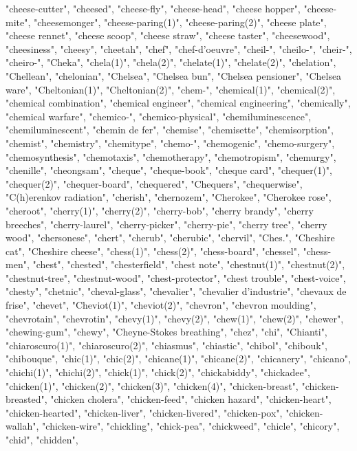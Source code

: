 "cheese-cutter",
"cheesed",
"cheese-fly",
"cheese-head",
"cheese hopper",
"cheese-mite",
"cheesemonger",
"cheese-paring(1)",
"cheese-paring(2)",
"cheese plate",
"cheese rennet",
"cheese scoop",
"cheese straw",
"cheese taster",
"cheesewood",
"cheesiness",
"cheesy",
"cheetah",
"chef",
"chef-d'oeuvre",
"cheil-",
"cheilo-",
"cheir-",
"cheiro-",
"Cheka",
"chela(1)",
"chela(2)",
"chelate(1)",
"chelate(2)",
"chelation",
"Chellean",
"chelonian",
"Chelsea",
"Chelsea bun",
"Chelsea pensioner",
"Chelsea ware",
"Cheltonian(1)",
"Cheltonian(2)",
"chem-",
"chemical(1)",
"chemical(2)",
"chemical combination",
"chemical engineer",
"chemical engineering",
"chemically",
"chemical warfare",
"chemico-",
"chemico-physical",
"chemiluminescence",
"chemiluminescent",
"chemin de fer",
"chemise",
"chemisette",
"chemisorption",
"chemist",
"chemistry",
"chemitype",
"chemo-",
"chemogenic",
"chemo-surgery",
"chemosynthesis",
"chemotaxis",
"chemotherapy",
"chemotropism",
"chemurgy",
"chenille",
"cheongsam",
"cheque",
"cheque-book",
"cheque card",
"chequer(1)",
"chequer(2)",
"chequer-board",
"chequered",
"Chequers",
"chequerwise",
"C(h)erenkov radiation",
"cherish",
"chernozem",
"Cherokee",
"Cherokee rose",
"cheroot",
"cherry(1)",
"cherry(2)",
"cherry-bob",
"cherry brandy",
"cherry breeches",
"cherry-laurel",
"cherry-picker",
"cherry-pie",
"cherry tree",
"cherry wood",
"chersonese",
"chert",
"cherub",
"cherubic",
"chervil",
"Ches.",
"Cheshire cat",
"Cheshire cheese",
"chess(1)",
"chess(2)",
"chess-board",
"chessel",
"chess-men",
"chest",
"chested",
"chesterfield",
"chest note",
"chestnut(1)",
"chestnut(2)",
"chestnut-tree",
"chestnut-wood",
"chest-protector",
"chest trouble",
"chest-voice",
"chesty",
"chetnic",
"cheval-glass",
"chevalier",
"chevalier d'industrie",
"chevaux de frise",
"chevet",
"Cheviot(1)",
"cheviot(2)",
"chevron",
"chevron moulding",
"chevrotain",
"chevrotin",
"chevy(1)",
"chevy(2)",
"chew(1)",
"chew(2)",
"chewer",
"chewing-gum",
"chewy",
"Cheyne-Stokes breathing",
"chez",
"chi",
"Chianti",
"chiaroscuro(1)",
"chiaroscuro(2)",
"chiasmus",
"chiastic",
"chibol",
"chibouk",
"chibouque",
"chic(1)",
"chic(2)",
"chicane(1)",
"chicane(2)",
"chicanery",
"chicano",
"chichi(1)",
"chichi(2)",
"chick(1)",
"chick(2)",
"chickabiddy",
"chickadee",
"chicken(1)",
"chicken(2)",
"chicken(3)",
"chicken(4)",
"chicken-breast",
"chicken-breasted",
"chicken cholera",
"chicken-feed",
"chicken hazard",
"chicken-heart",
"chicken-hearted",
"chicken-liver",
"chicken-livered",
"chicken-pox",
"chicken-wallah",
"chicken-wire",
"chickling",
"chick-pea",
"chickweed",
"chicle",
"chicory",
"chid",
"chidden",
